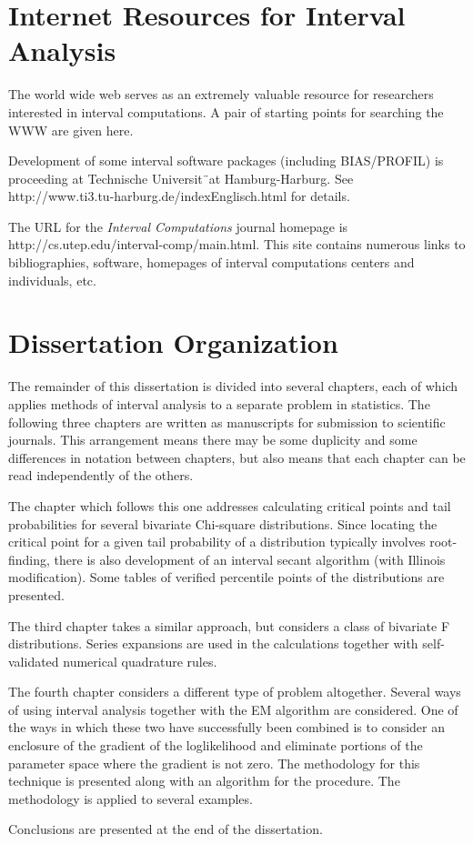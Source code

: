 \section{Internet Resources for Interval Analysis}

The world wide web serves as an extremely valuable resource for researchers
interested in interval computations. A pair of starting points for searching
the WWW are given here.  

Development of some interval software packages (including BIAS/PROFIL) is
proceeding at Technische Universit¨at Hamburg-Harburg. See\\
http://www.ti3.tu-harburg.de/indexEnglisch.html for details. 

The URL for the {\it Interval Computations} journal homepage is \\
http://cs.utep.edu/interval-comp/main.html. 
This site contains numerous links to bibliographies, software, homepages of
interval computations centers and individuals, etc.  

\section{Dissertation Organization }
The remainder of this dissertation is divided into several chapters, each of
which applies methods of interval analysis to a separate problem in
statistics. The following three chapters are written as manuscripts for
submission to scientific journals. This arrangement means there may be some
duplicity and some differences in notation between  
chapters, but also means that each chapter can be read independently of the
others. 

The chapter which follows this one addresses calculating critical points and
tail probabilities for several bivariate Chi-square distributions. Since
locating the critical point  for a given tail probability of a distribution
typically involves root-finding, there is also development of an interval
secant algorithm (with Illinois modification). Some tables of verified
percentile points of the distributions are presented.  

The third chapter takes a similar approach, but considers a class of bivariate
F distributions. Series expansions are used in the calculations together with
self-validated numerical quadrature rules.  

The fourth chapter considers a different type of problem altogether. Several
ways of using interval analysis together with the EM algorithm are
considered. One of the ways in which these two have successfully been combined
is to consider an enclosure of the gradient of the loglikelihood and eliminate
portions of the parameter space where the gradient is not zero. The
methodology for this technique is presented along with an algorithm for the
procedure. The methodology is applied to several examples.  

Conclusions are presented at the end of the dissertation. 
